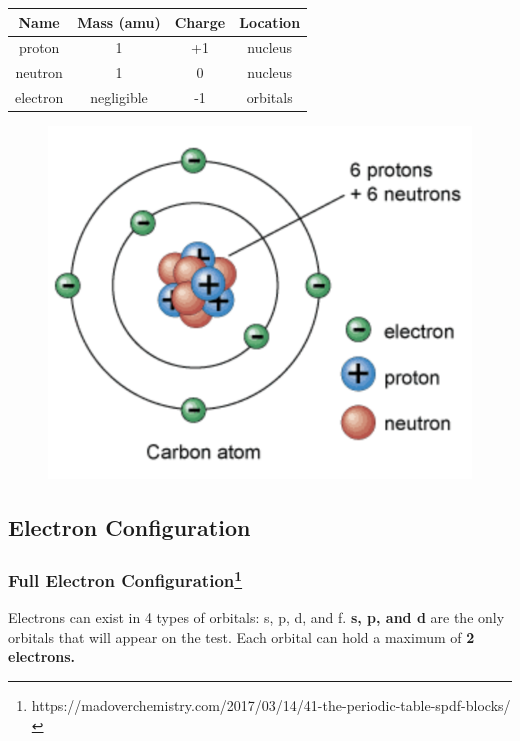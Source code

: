 \documentclass[a4paper, 12pt]{article}
\begin{document}
\begin{center}
\begin{tabular}{c|c|c|c}

     \textbf{Name} & \textbf{Mass (amu)} & \textbf{Charge} & \textbf{Location} \\\hline
     proton & 1 & +1 & nucleus \\
     neutron & 1 & 0 & nucleus \\
     electron & negligible & -1 & orbitals
\end{tabular}
\end{center}

\begin{figure}[ht]
    \centering
    \includegraphics[width=0.5\linewidth]{atom.png}
    \label{fig:1}
\end{figure}

\subsection*{Electron Configuration}
\subsubsection*{Full Electron Configuration\footnote{https://madoverchemistry.com/2017/03/14/41-the-periodic-table-spdf-blocks/}}
Electrons can exist in 4 types of orbitals: s, p, d, and f. \textbf{s, p, and d} are the only orbitals that will appear on the test. Each orbital can hold a maximum of \textbf{2 electrons.}
\end{document}
